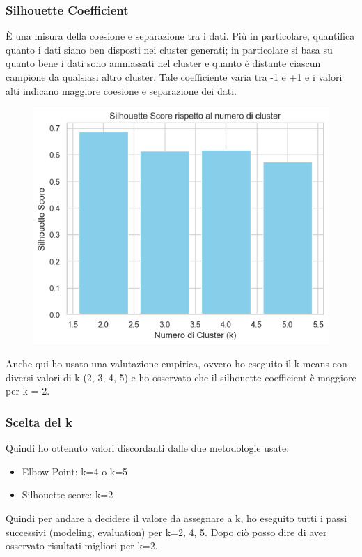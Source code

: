 \documentclass[]{article}
\begin{document}
            \subsubsection{Silhouette Coefficient}
                È una misura della coesione e separazione tra i dati. Più in particolare, quantifica quanto i dati siano ben disposti nei cluster generati; in particolare si basa su quanto bene i dati sono ammassati nel cluster e quanto è distante ciascun campione da qualsiasi altro cluster. Tale coefficiente varia tra -1 e +1 e i valori alti indicano maggiore coesione e separazione dei dati.
                \begin{figure}[H]
                    \centering
                    \includegraphics[width=0.6\linewidth]{images/silhouetteScores.png}
                    \label{fig:enter-label}
                \end{figure}
                Anche qui ho usato una valutazione empirica, ovvero ho eseguito il k-means con diversi valori di k (2, 3, 4, 5) e ho osservato che il silhouette coefficient è maggiore per k = 2.

            \subsubsection{Scelta del k}
                Quindi ho ottenuto valori discordanti dalle due metodologie usate:
                \begin{itemize}
                    \item Elbow Point: k=4 o k=5
                    \item Silhouette score: k=2
                \end{itemize}
                Quindi per andare a decidere il valore da assegnare a k, ho eseguito tutti i passi successivi (modeling, evaluation) per k=2, 4, 5. Dopo ciò posso dire di aver osservato  risultati migliori per k=2.\\
\end{document}
